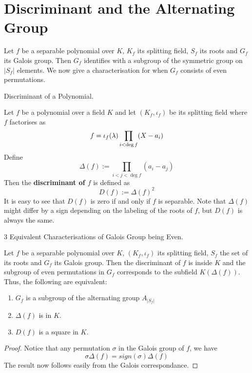 \documentclass[../book.tex]{subfiles}
\begin{document}
\section{Discriminant and the Alternating Group}

\begin{rmk}
    Let $f$ be a separable polynomial over $K$, $K_f$ its splitting field,
    $S_f$ its roots and $G_f$ its Galois group. 
    Then $G_f$ identifies with a subgroup of the symmetric group on $|S_f|$ elements.
    We now give a characterisation for when $G_f$ consists of even permutations. 
\end{rmk}

\begin{dfn} Discriminant of a Polynomial. 
    
    Let $f$ be a polynomial over a field $K$
    and let $(K_f,\iota_f)$ be its splitting field
    where $f$ factorises as \[
        f = \iota_f(\lambda) \prod_{i < \deg f} (X - a_i)
    \]
    Define \[
        \Delta(f) := \prod_{i < j < \deg f} (a_i - a_j)
    \]
    Then the \textbf{discriminant of $f$} is defined as \[
        D(f) := \Delta(f)^2
    \]
    It is easy to see that $D(f)$ is zero if and only if $f$ is separable. 
    Note that $\Delta(f)$ might differ by a sign depending on
    the labeling of the roots of $f$, but $D(f)$ is always the same. 
    
\end{dfn}

\begin{thm} 3 Equivalent Characterisations of Galois Group being Even.
    
    Let $f$ be a separable polynomial over $K$, $(K_f,\iota_f)$ its splitting field,
    $S_f$ the set of its roots and $G_f$ its Galois group. 
    Then the discriminant of $f$ is inside $K$ and 
    the subgroup of even permutations in $G_f$ corresponds 
    to the subfield $K(\Delta(f))$.
    Thus, the following are equivalent: 
    \begin{enumerate}
        \item $G_f$ is a subgroup of the alternating group $A_{|S_f|}$
        \item $\Delta(f)$ is in $K$.
        \item $D(f)$ is a square in $K$. 
    \end{enumerate}
    
\end{thm}
\begin{proof}
    
    Notice that any permutation $\sigma$ in the Galois group of $f$, 
    we have \[
        \sigma \Delta(f) = sign(\sigma) \Delta(f)
    \]
    The result now follows easily from the Galois correspondance. 
    
\end{proof}
\end{document}
